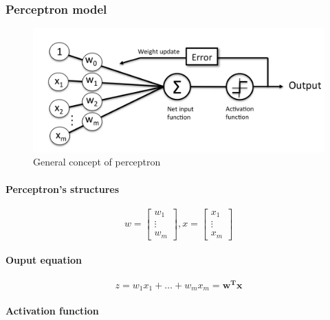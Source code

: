 \documentclass{article}
\begin{document}
			\subsubsection{Perceptron model}
			
			\begin{figure}[htpb!]
				\centering
				\includegraphics[scale=.1]{perceptron-concept}
				\caption{General concept of perceptron}
				\label{fig:perceptron-concept}
			\end{figure}
			
			\paragraph{Perceptron's structures}
			\begin{equation*}
				w = \begin{bmatrix}
						w_1 \\
						\vdots \\
						w_m
					\end{bmatrix}, x = 
					\begin{bmatrix}
						x_1 \\
						\vdots \\
						x_m
					\end{bmatrix}
			\end{equation*}

			\paragraph{Ouput equation}			
			\begin{equation*}
				z = w_1 x_1 + \dots + w_m x_m = \boldsymbol{w^T x}
			\end{equation*}
			
			
			\paragraph{Activation function}
			
\end{document}
